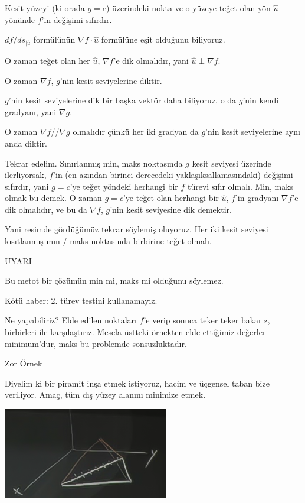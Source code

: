 \documentclass[12pt,fleqn]{article}\usepackage{../../common}
\begin{document}
Kesit yüzeyi (ki orada $g=c$) üzerindeki nokta ve o yüzeye teğet olan yön
$\hat{u}$ yönünde $f$'in değişimi sıfırdır. 

$df / ds_{|\hat{u}}$ formülünün $\nabla f \cdot \hat{u}$ formülüne eşit olduğunu 
 biliyoruz. 

O zaman teğet olan her $\hat{u}$, $\nabla f$'e dik olmalıdır, yani
$\hat{u} \perp \nabla f$. 

O zaman $\nabla f$, $g$'nin kesit seviyelerine diktir. 

$g$'nin kesit seviyelerine dik bir başka vektör daha biliyoruz, o 
da $g$'nin kendi gradyanı, yani $\nabla g$. 

O zaman $\nabla f // \nabla g$ olmalıdır çünkü her iki gradyan da $g$'nin
kesit seviyelerine aynı anda diktir. 

Tekrar edelim. Sınırlanmış min, maks noktasında $g$ kesit seviyesi üzerinde
ilerliyorsak, $f$'in (en azından birinci derecedeki yaklaşıksallamasındaki)
değişimi sıfırdır, yani $g=c$'ye teğet yöndeki herhangi bir $f$ türevi sıfır
olmalı. Min, maks olmak bu demek. O zaman $g=c$'ye teğet olan herhangi bir
$\hat{u}$, $f$'in gradyanı $\nabla f$'e dik olmalıdır, ve bu da $\nabla f$,
$g$'nin kesit seviyesine dik demektir. 

Yani resimde gördüğümüz tekrar söylemiş oluyoruz. Her iki kesit seviyesi
kısıtlanmış mın / maks noktasında birbirine teğet olmalı.

UYARI

Bu metot bir çözümün min mi, maks mi olduğunu söylemez. 

Kötü haber: 2. türev testini kullanamayız. 

Ne yapabiliriz? Elde edilen noktaları $f$'e verip sonuca teker teker
bakarız, birbirleri ile karşılaştırız. Mesela üstteki örnekten elde
ettiğimiz değerler minimum'dur, maks bu problemde sonsuzluktadır.

Zor Örnek

Diyelim ki bir piramit inşa etmek istiyoruz, hacim ve üçgensel taban bize
veriliyor. Amaç, tüm dış yüzey alanını minimize etmek. 

\includegraphics[height=4cm]{13_8.png}
\end{document}
